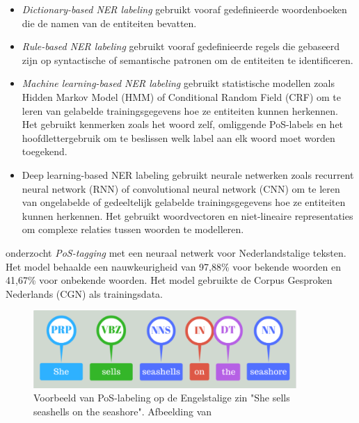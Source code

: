 \begin{itemize}
		\item \textit{Dictionary-based NER labeling} gebruikt vooraf gedefinieerde woordenboeken die de namen van de entiteiten bevatten.
		\item \textit{Rule-based NER labeling} gebruikt vooraf gedefinieerde regels die gebaseerd zijn op syntactische of semantische patronen om de entiteiten te identificeren.
		\item \textit{Machine learning-based NER labeling} gebruikt statistische modellen zoals Hidden Markov Model (HMM) of Conditional Random Field (CRF) om te leren van gelabelde trainingsgegevens hoe ze entiteiten kunnen herkennen. Het gebruikt kenmerken zoals het woord zelf, omliggende PoS-labels en het hoofdlettergebruik om te beslissen welk label aan elk woord moet worden toegekend.
		\item Deep learning-based NER labeling gebruikt neurale netwerken zoals recurrent neural network (RNN) of convolutional neural network (CNN) om te leren van ongelabelde of gedeeltelijk gelabelde trainingsgegevens hoe ze entiteiten kunnen herkennen. Het gebruikt woordvectoren en niet-lineaire representaties om complexe relaties tussen woorden te modelleren.
\end{itemize}

\textcite{Poel2008} onderzocht \textit{PoS-tagging} met een neuraal netwerk voor Nederlandstalige teksten. Het model behaalde een nauwkeurigheid van 97,88\% voor bekende woorden en 41,67\% voor onbekende woorden. Het model gebruikte de Corpus Gesproken Nederlands (CGN) als trainingsdata.

\begin{figure}[H]
	\begin{center}
		\includegraphics[width=10cm]{img/poslabeling.png}
	\end{center}
	\caption{Voorbeeld van PoS-labeling op de Engelstalige zin "She sells seashells on the seashore". Afbeelding van \textcite{Bilisci2021} }
	\label{fig:pos}
\end{figure}

